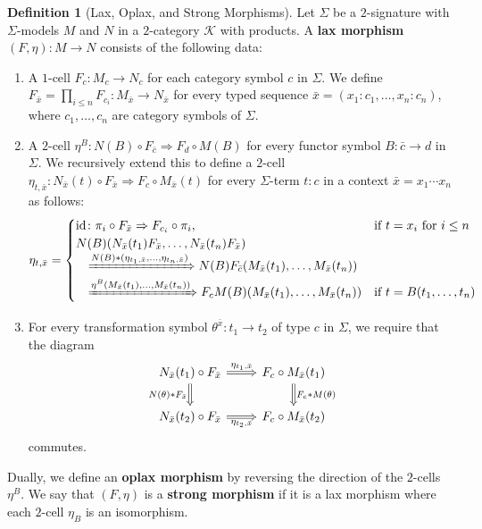\documentclass[11pt]{article}
\theoremstyle{plain}
\theoremstyle{definition}
\newtheorem{definition}[theorem]{Definition}
\numberwithin{equation}{section}
\newcommand{\K}{\mathcal{K}}
\newcommand{\id}{\mathrm{id}}
\begin{document}
\begin{definition}[Lax, Oplax, and Strong Morphisms]\label{def:laxStrongMorphisms}
   Let $\Sigma$ be a $2$-signature with $\Sigma$-models $M$ and $N$ in a $2$-category $\K$ with products. A \textbf{lax morphism} $(F,\eta) \colon M \to N$ consists of the following data:
   \begin{enumerate}
       \item A $1$-cell $F_c \colon M_c \to N_c$ for each category symbol $c$ in $\Sigma$. We define $F_{\bar{x}} = \prod_{i\leq n} F_{c_i}\colon M_{\bar{x}}\to N_{\bar{x}}$ for every typed sequence $\bar{x} = (x_1\colon c_1,\ldots, x_n\colon c_n)$, where $c_1,\ldots, c_n$ are category symbols of $\Sigma$. 
       \item A $2$-cell $\eta^B \colon N(B) \circ F_{\bar{c}} \Rightarrow F_d \circ M(B)$ for every functor symbol $B \colon \bar{c} \to d$ in $\Sigma$. We recursively extend this to define a $2$-cell $\eta_{t, \bar{x}} \colon N_{\bar{x}}(t) \circ F_{\bar{x}} \Rightarrow F_c \circ M_{\bar{x}} (t)$ for every $\Sigma$-term $t \colon c$ in a context $\bar{x} = x_1\cdots x_n$ as follows:
   $$
\eta_{t,\bar{x}} = \begin{cases}
   \id\colon \pi_i\circ F_{\bar{x}}\Rightarrow F_{c_i}\circ \pi_i, & \text{if $t = x_i$ for $i\leq n$} \\
   N(B)(N_{\bar{x}}(t_1)F_{\bar{x}},\ldots, N_{\bar{x}}(t_n)F_{\bar{x}}) \\
\quad \xRightarrow{N(B)*(\eta_{t_1,\bar{x}},\dots, \eta_{t_n, \bar{x}})} N(B)F_{\bar{c}}(M_{\bar{x}}(t_1),\dots, M_{\bar{x}}(t_n))\\
   \quad \xRightarrow{\eta^B(M_{\bar{x}}(t_1),\dots, M_{\bar{x}}(t_n))} F_c M(B)(M_{\bar{x}}(t_1),\dots, M_{\bar{x}}(t_n)) & \text{if $t = B(t_1,\dots, t_n)$}
\end{cases}
       $$
       \item For every transformation symbol $\theta^{\bar{x}} \colon t_1 \to t_2$ of type $c$ in $\Sigma$, we require that the diagram
       $$
       \begin{tikzcd}[ampersand replacement=\&]
       N_{\bar{x}}(t_1) \circ F_{\bar{x}} \arrow[r, "\eta_{t_1, \bar{x}}", Rightarrow] \arrow[d, "N(\theta)*F_{\bar{x}}"', Rightarrow] \& F_c \circ M_{\bar{x}}(t_1) \arrow[d, "F_c*M(\theta)", Rightarrow] \\
       N_{\bar{x}}(t_2) \circ F_{\bar{x}} \arrow[r, "\eta_{t_2, \bar{x}}"' , Rightarrow]                                               \& F_c \circ M_{\bar{x}}(t_2)
       \end{tikzcd}
       $$
       commutes.
   \end{enumerate}
   Dually, we define an \textbf{oplax morphism} by reversing the direction of the $2$-cells $\eta^B$. We say that $(F,\eta)$ is a \textbf{strong morphism} if it is a lax morphism where each $2$-cell $\eta_B$ is an isomorphism.
\end{definition}
\end{document}
